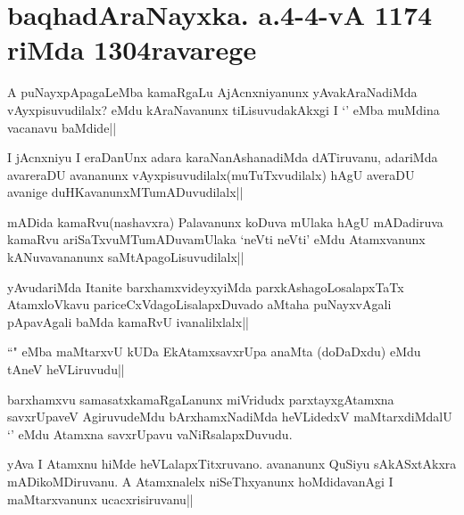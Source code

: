 \section*{baqhadAraNayxka. a.4-4-vA 1174 riMda 1304ravarege}

\begin{artha}
A puNayxpApagaLeMba kamaRgaLu AjAcnxniyanunx yAvakAraNadiMda vAyxpisuvudilalx? eMdu 
kAraNavanunx tiLisuvudakAkxgi I `\stext' eMba muMdina vacanavu baMdide||
\end{artha}

\begin{artha}
I jAcnxniyu I eraDanUnx adara karaNanAshanadiMda dATiruvanu, adariMda avareraDU avananunx vAyxpisuvudilalx(muTuTxvudilalx) hAgU averaDU avanige duHKavanunxMTumADuvudilalx||
\end{artha}


\begin{artha}
mADida kamaRvu(nashavxra) Palavanunx koDuva mUlaka hAgU mADadiruva kamaRvu ariSaTxvuMTumADuvamUlaka `neVti neVti' eMdu Atamxvanunx kANuvavananunx saMtApagoLisuvudilalx||
\end{artha}


\begin{artha}
yAvudariMda Itanite barxhamxvideyxyiMda parxkAshagoLosalapxTaTx AtamxloVkavu pariceCxVdagoLisalapxDuvado aMtaha puNayxvAgali pApavAgali baMda kamaRvU ivanalilxlalx||
\end{artha}


\begin{artha}
``\stext" eMba maMtarxvU kUDa EkAtamxsavxrUpa anaMta (doDaDxdu) eMdu tAneV heVLiruvudu||
\end{artha}

\begin{artha}
barxhamxvu samasatxkamaRgaLanunx miVridudx parxtayxgAtamxna savxrUpaveV AgiruvudeMdu bArxhamxNadiMda heVLidedxV maMtarxdiMdalU `\stext' eMdu Atamxna savxrUpavu vaNiRsalapxDuvudu.
\end{artha}



\begin{artha}
yAva I Atamxnu hiMde heVLalapxTitxruvano. avananunx QuSiyu sAkASxtAkxra mADikoMDiruvanu. A Atamxnalelx niSeThxyanunx hoMdidavanAgi I maMtarxvanunx ucacxrisiruvanu||
\end{artha}

